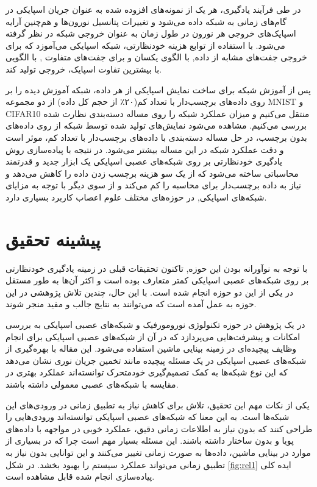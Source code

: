 در طی فرآیند یادگیری، هر یک از نمونه‌های افزوده شده به عنوان جریان اسپایکی در گام‌های زمانی به شبکه داده می‌شود و تغییرات پتانسیل نورون‌ها و هم‌چنین آرایه اسپایک‌های خروجی هر نورون در طول زمان به عنوان خروجی شبکه در نظر گرفته می‌شود. با استفاده از توابع هزینه خودنظارتی، شبکه اسپایکی می‌آموزد که برای خروجی جفت‌های مشابه از داده, با الگوی یکسان و برای جفت‌های متفاوت , با الگویی با بیشترین تفاوت اسپایک، خروجی تولید کند.

پس از آموزش شبکه برای ساخت نمایش اسپایکی از هر داده، شبکه آموزش دیده را بر روی داده‌های برچسب‌دار با تعداد کم(۲۰٪ از حجم کل داده) از دو مجموعه MNIST و CIFAR10 منتقل می‌کنیم و میزان عملکرد شبکه را روی مساله دسته‌بندی نظارت شده بررسی می‌کنیم. مشاهده می‌شود نمایش‌های تولید شده توسط شبکه از روی داده‌های بدون برچسب، در حل مساله دسته‌بندی با داده‌های برچسب‌دار با تعداد کم، موثر است و دقت عملکرد شبکه در این مساله بیشتر می‌شود. 
در نتیجه با پیاده‌سازی روش یادگیری خودنظارتی بر روی شبکه‌های عصبی اسپایکی یک ابزار جدید و قدرتمند محاسباتی ساخته می‌شود که از یک سو هزینه برچسب‌ زدن داده را کاهش می‌دهد و نیاز به داده برچسب‌دار برای محاسبه را کم می‌کند و از سوی دیگر با توجه به مزایای شبکه‌های اسپایکی, در حوزه‌های مختلف علوم اعصاب کاربرد بسیاری دارد.

\section{پیشینه تحقیق}

با توجه به نوآورانه بودن این حوزه, تاکنون تحقیقات قبلی در زمینه‌ یادگیری خودنظارتی بر روی شبکه‌های عصبی اسپایکی کمتر متعارف بوده است و اکثر آن‌ها به طور مستقل در یکی از این دو حوزه انجام شده است. با این حال، چندین تلاش پژوهشی در این حوزه به عمل آمده است که می‌توانند به نتایج جالب و مفید منجر شوند.


در یک پژوهش در حوزه تکنولوژی نورومورفیک و شبکه‌های عصبی اسپایکی به بررسی امکانات و پیشرفت‌هایی می‌پردازد که در آن از شبکه‌های عصبی اسپایکی برای انجام وظایف پیچیده‌ای در زمینه بینایی ماشین استفاده می‌شود. این مقاله با بهره‌گیری از شبکه‌های عصبی اسپایکی در یک مسئله پیچیده مانند تخمین جریان نوری نشان می‌دهد که این نوع شبکه‌ها به کمک تصمیم‌گیری خودمتحرک توانسته‌اند عملکرد بهتری در مقایسه با شبکه‌های عصبی معمولی داشته باشند.

یکی از نکات مهم این تحقیق، تلاش برای کاهش نیاز به تطبیق زمانی در ورودی‌های این شبکه‌ها است. به این معنا که شبکه‌های عصبی اسپایکی توانسته‌اند ورودی‌هایی را طراحی کنند که بدون نیاز به اطلاعات زمانی دقیق، عملکرد خوبی در مواجهه با داده‌های پویا و بدون ساختار داشته باشند. این مسئله بسیار مهم است چرا که در بسیاری از موارد در بینایی ماشین، داده‌ها به صورت زمانی تغییر می‌کنند و این توانایی بدون نیاز به تطبیق زمانی می‌تواند عملکرد سیستم را بهبود بخشد.
در شکل \ref{fig:rel1}  ایده کلی پیاده‌سازی انجام شده قابل مشاهده است.

